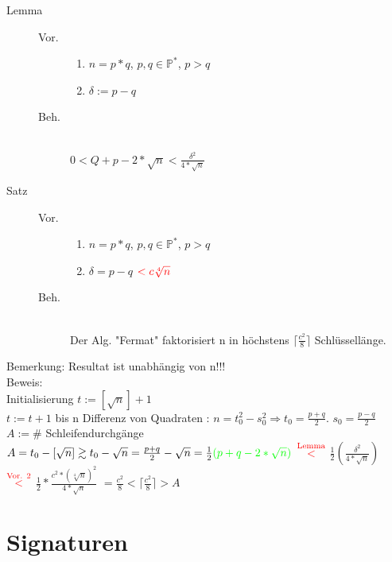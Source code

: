 \documentclass[10pt]{article}
\newcommand{\PN}{\mathbb{P}} %
\newcommand{\T}[1]{\text{#1}} %
\newcommand{\Ra}{\Rightarrow}
\newcommand{\Oben}[2]{\overset{#1}{#2}} %
\begin{document}
\begin{description}
	\item[Lemma] \hfill 
		\begin{description}
			\item[Vor.] \hfill
				\begin{enumerate}
					\item $n=p*q$, $p,q \in \PN^*$, $p>q$
					\item $\delta :=p-q$
				\end{enumerate}
			\item[Beh.] \hfill \\
				$0<Q+p-2*\sqrt{n} < \frac{\delta^2}{4*\sqrt{n}}$
		\end{description}
	\item[Satz] \hfill
		\begin{description}
			\item[Vor.] \hfill
				\begin{enumerate}
					\item $n=p*q$, $p,q\in \PN^*$, $p>q$
					\item $\delta = p-q$ ${\color{red}< c \sqrt[4]{n}}$
				\end{enumerate}
			\item[Beh.] \hfill \\
				Der Alg. "Fermat" faktorisiert n in höchstens $\lceil\frac{c^2}{8}\rceil$ Schlüssellänge.
		\end{description}
\end{description}
{\color{red} Bemerkung: Resultat ist unabhängig von n!!!} \\
Beweis: \\
Initialisierung $t:=[\sqrt{n}]+1$ \\
$t:=t+1$ bis n Differenz von Quadraten : $n=t_0^2-s_0^2 \Ra t_0=\frac{p+q}{2}$. $s_0=\frac{p-q}{2}$ \\
$A:=\#$ Schleifendurchgänge \\
$A=t_0-[\sqrt{n}] \gtrsim t_0 -\sqrt{n} = \frac{p+q}{2}-\sqrt{n}=\frac{1}{2}{\color{green}(p+q-2*\sqrt{n})}$ ${\color{red} \Oben{\T{Lemma}}{<}}$ $\frac{1}{2}(\frac{\delta^2}{4*\sqrt{n}})$ ${\color{red} \Oben{\T{Vor. 2}}{<}}$ $\frac{1}{2}*\frac{c^2*(\sqrt[4]{n})^2}{4*\sqrt{n}}$ {\color{red} $=\frac{c^2}{8} < \lceil\frac{c^2}{8}\rceil$}$> A$\\
\section{Signaturen}
\end{document}
